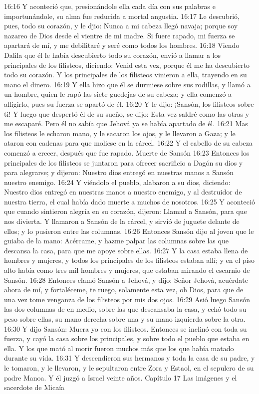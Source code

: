 16:16 Y aconteció que, presionándole ella cada día con sus palabras e importunándole, su alma fue reducida a mortal angustia.  
16:17 Le descubrió, pues, todo su corazón, y le djio: Nunca a mi cabeza llegó navaja; porque soy nazareo de Dios desde el vientre de mi madre. Si fuere rapado, mi fuerza se apartará de mí, y me debilitaré y seré como todos los hombres.  
16:18 Viendo Dalila que él le había descubierto todo su corazón, envió a llamar a los principales de los filisteos, diciendo: Venid esta vez, porque él me ha descubierto todo su corazón. Y los principales de los filisteos vinieron a ella, trayendo en su mano el dinero.  
16:19 Y ella hizo que él se durmiese sobre sus rodillas, y llamó a un hombre, quien le rapó las siete guedejas de su cabeza; y ella comenzó a afligirlo, pues su fuerza se apartó de él.  
16:20 Y le dijo: ¡Sansón, los filisteos sobre ti! Y luego que despertó él de su sueño, se dijo: Esta vez saldré como las otras y me escaparé. Pero él no sabía que Jehová ya se había apartado de él.  
16:21 Mas los filisteos le echaron mano, y le sacaron los ojos, y le llevaron a Gaza; y le ataron con cadenas para que moliese en la cárcel.  
16:22 Y el cabello de su cabeza comenzó a crecer, después que fue rapado.  
Muerte de Sansón  
16:23 Entonces los principales de los filisteos se juntaron para ofrecer sacrificio a Dagón su dios y para alegrarse; y dijeron: Nuestro dios entregó en nuestras manos a Sansón nuestro enemigo.  
16:24 Y viéndolo el pueblo, alabaron a su dios, diciendo: Nuestro dios entregó en nuestras manos a nuestro enemigo, y al destruidor de nuestra tierra, el cual había dado muerte a muchos de nosotros. 
16:25 Y aconteció que cuando sintieron alegría en su corazón, dijeron: Llamad a Sansón, para que nos divierta. Y llamaron a Sansón de la cárcel, y sirvió de juguete delante de ellos; y lo pusieron entre las columnas.  
16:26 Entonces Sansón dijo al joven que le guiaba de la mano: Acércame, y hazme palpar las columnas sobre las que descansa la casa, para que me apoye sobre ellas.  
16:27 Y la casa estaba llena de hombres y mujeres, y todos los principales de los filisteos estaban allí; y en el piso alto había como tres mil hombres y mujeres, que estaban mirando el escarnio de Sansón.  
16:28 Entonces clamó Sansón a Jehová, y dijo: Señor Jehová, acuérdate ahora de mí, y fortaléceme, te ruego, solamente esta vez, oh Dios, para que de una vez tome venganza de los filisteos por mis dos ojos.  
16:29 Asió luego Sansón las dos columnas de en medio, sobre las que descansaba la casa, y echó todo su peso sobre ellas, su mano derecha sobre una y su mano izquierda sobre la otra.  
16:30 Y dijo Sansón: Muera yo con los filisteos. Entonces se inclinó con toda su fuerza, y cayó la casa sobre los principales, y sobre todo el pueblo que estaba en ella. Y los que mató al morir fueron muchos más que los que había matado durante su vida.  
16:31 Y descendieron sus hermanos y toda la casa de su padre, y le tomaron, y le llevaron, y le sepultaron entre Zora y Estaol, en el sepulcro de su padre Manoa. Y él juzgó a Israel veinte años.  
Capítulo 17 
Las imágenes y el sacerdote de Micaía 

